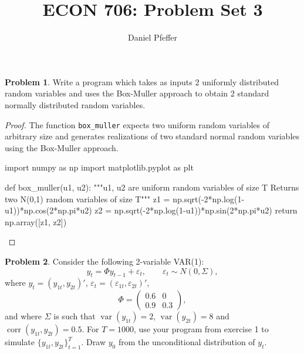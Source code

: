 \documentclass[oneside,reqno]{amsart}
\title{ECON 706: Problem Set 3}
\author{Daniel Pfeffer}
\DeclareMathOperator{\var}{var}
\DeclareMathOperator{\corr}{corr}
\newcommand{\eps}{\varepsilon}
\theoremstyle{definition}
\newtheorem{prob}{Problem}
\begin{document}
\maketitle

\begin{prob}
Write a program which takes as inputs 2 uniformly distributed random variables and uses the Box-Muller approach to obtain 2 standard normally distributed random variables.
\end{prob}

\begin{proof}
The function \texttt{box_muller} expects two uniform random variables of arbitrary size and generates realizations of two standard normal random variables using the Box-Muller approach.
\begin{python3code}
import numpy as np
import matplotlib.pyplot as plt

def box_muller(u1, u2):
    """u1, u2 are uniform random variables of size T
    Returns two N(0,1) random variables of size T"""
    z1 = np.sqrt(-2*np.log(1-u1))*np.cos(2*np.pi*u2)
    z2 = np.sqrt(-2*np.log(1-u1))*np.sin(2*np.pi*u2)
    return np.array([z1, z2])
\end{python3code}
\end{proof}

\begin{prob}
Consider the following 2-variable VAR(1):
\[
	y_t = \Phi y_{t-1} + \eps_t, 
	\qquad \eps_t \sim N(0, \Sigma),
\]
where $y_t = (y_{1t}, y_{2t})'$, $\eps_t = (\eps_{1t}, \eps_{2t})'$, 
\[
	\Phi = \begin{pmatrix}
		0.6 & 0 \\
		0.9 & 0.3 
	\end{pmatrix},
\]
and where $\Sigma$ is such that $\var(y_{1t}) = 2$, $\var(y_{2t}) = 8$ and  $\corr(y_{1t}, y_{2t}) = 0.5$. For $T=1000$, use your program from exercise 1 to simulate $\{y_{1t}, y_{2t}\}_{t=1}^T$. Draw $y_0$ from the unconditional distribution of $y_t$.
\end{prob}
\end{document}

